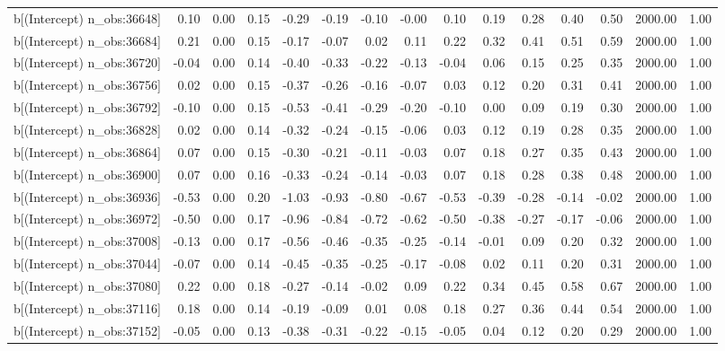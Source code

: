 \begin{table}[ht]
\begin{tabular}{rrrrrrrrrrrrrrr}
  b[(Intercept) n\_obs:36648] & 0.10 & 0.00 & 0.15 & -0.29 & -0.19 & -0.10 & -0.00 & 0.10 & 0.19 & 0.28 & 0.40 & 0.50 & 2000.00 & 1.00 \\ 
  b[(Intercept) n\_obs:36684] & 0.21 & 0.00 & 0.15 & -0.17 & -0.07 & 0.02 & 0.11 & 0.22 & 0.32 & 0.41 & 0.51 & 0.59 & 2000.00 & 1.00 \\ 
  b[(Intercept) n\_obs:36720] & -0.04 & 0.00 & 0.14 & -0.40 & -0.33 & -0.22 & -0.13 & -0.04 & 0.06 & 0.15 & 0.25 & 0.35 & 2000.00 & 1.00 \\ 
  b[(Intercept) n\_obs:36756] & 0.02 & 0.00 & 0.15 & -0.37 & -0.26 & -0.16 & -0.07 & 0.03 & 0.12 & 0.20 & 0.31 & 0.41 & 2000.00 & 1.00 \\ 
  b[(Intercept) n\_obs:36792] & -0.10 & 0.00 & 0.15 & -0.53 & -0.41 & -0.29 & -0.20 & -0.10 & 0.00 & 0.09 & 0.19 & 0.30 & 2000.00 & 1.00 \\ 
  b[(Intercept) n\_obs:36828] & 0.02 & 0.00 & 0.14 & -0.32 & -0.24 & -0.15 & -0.06 & 0.03 & 0.12 & 0.19 & 0.28 & 0.35 & 2000.00 & 1.00 \\ 
  b[(Intercept) n\_obs:36864] & 0.07 & 0.00 & 0.15 & -0.30 & -0.21 & -0.11 & -0.03 & 0.07 & 0.18 & 0.27 & 0.35 & 0.43 & 2000.00 & 1.00 \\ 
  b[(Intercept) n\_obs:36900] & 0.07 & 0.00 & 0.16 & -0.33 & -0.24 & -0.14 & -0.03 & 0.07 & 0.18 & 0.28 & 0.38 & 0.48 & 2000.00 & 1.00 \\ 
  b[(Intercept) n\_obs:36936] & -0.53 & 0.00 & 0.20 & -1.03 & -0.93 & -0.80 & -0.67 & -0.53 & -0.39 & -0.28 & -0.14 & -0.02 & 2000.00 & 1.00 \\ 
  b[(Intercept) n\_obs:36972] & -0.50 & 0.00 & 0.17 & -0.96 & -0.84 & -0.72 & -0.62 & -0.50 & -0.38 & -0.27 & -0.17 & -0.06 & 2000.00 & 1.00 \\ 
  b[(Intercept) n\_obs:37008] & -0.13 & 0.00 & 0.17 & -0.56 & -0.46 & -0.35 & -0.25 & -0.14 & -0.01 & 0.09 & 0.20 & 0.32 & 2000.00 & 1.00 \\ 
  b[(Intercept) n\_obs:37044] & -0.07 & 0.00 & 0.14 & -0.45 & -0.35 & -0.25 & -0.17 & -0.08 & 0.02 & 0.11 & 0.20 & 0.31 & 2000.00 & 1.00 \\ 
  b[(Intercept) n\_obs:37080] & 0.22 & 0.00 & 0.18 & -0.27 & -0.14 & -0.02 & 0.09 & 0.22 & 0.34 & 0.45 & 0.58 & 0.67 & 2000.00 & 1.00 \\ 
  b[(Intercept) n\_obs:37116] & 0.18 & 0.00 & 0.14 & -0.19 & -0.09 & 0.01 & 0.08 & 0.18 & 0.27 & 0.36 & 0.44 & 0.54 & 2000.00 & 1.00 \\ 
  b[(Intercept) n\_obs:37152] & -0.05 & 0.00 & 0.13 & -0.38 & -0.31 & -0.22 & -0.15 & -0.05 & 0.04 & 0.12 & 0.20 & 0.29 & 2000.00 & 1.00 \\ 

\end{tabular}
\end{table}

